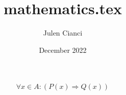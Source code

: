 \documentclass{article}
\title{mathematics.tex}
\author{Julen Cianci}
\date{December 2022}
\begin{document}
\begin{equation}
    \forall x \in A : (P(x) \Longrightarrow Q(x))
\end{equation}
\end{document}
